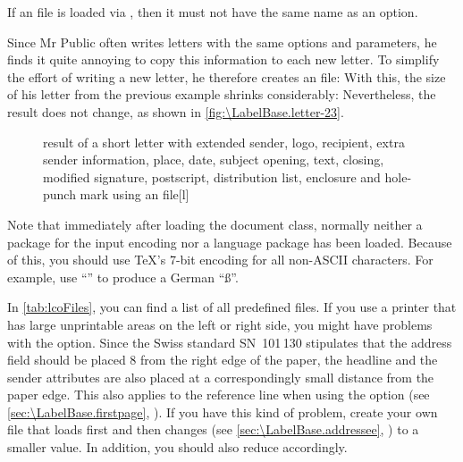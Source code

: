 If an  file is loaded via
, then it must not have the same name as an option.

\begin{Example}
  Since Mr Public often writes letters with the same options and parameters,
  he finds it quite annoying to copy this information to each new letter. To
  simplify the effort of writing a new letter, he therefore creates an
   file:%
  With this, the size of his letter from the previous example shrinks
  considerably: %
  Nevertheless, the result does not change, as shown in
  \autoref{fig:\LabelBase.letter-23}.
  \begin{figure}
    \setcapindent{0pt}%
    \begin{captionbeside}
      {result of a short letter with extended sender, logo, recipient,
        extra sender information, place, date, subject opening, text,
        closing, modified signature, postscript, distribution list, enclosure
        and hole-punch mark using an  file}[l]
    \end{captionbeside}
    \label{fig:\LabelBase.letter-23}
  \end{figure}
\end{Example}

Note that immediately after loading the document class,
normally neither a package for the input encoding nor a language package has
been loaded. Because of this, you should use \TeX's 7-bit encoding for all
non-ASCII characters. For example, use ``'' to produce a German
``\ss''.

In \autoref{tab:lcoFiles},  you can find a list of
all predefined  files. If you use a printer
that has large unprintable areas on the left or right side, you might have
problems with the  option. Since the Swiss standard
SN~101\,130 stipulates that the address field should be placed 8 from
the right edge of the paper, the headline and the sender attributes are also
placed at a correspondingly small distance from the paper edge. This also
applies to the reference line when using the
 option (see
\autoref{sec:\LabelBase.firstpage}, ).
If you have this kind of problem, create your own 
file that loads  first and then changes
 (see
\autoref{sec:\LabelBase.addressee},
) to a smaller value. In
addition, you should also reduce  accordingly.%

